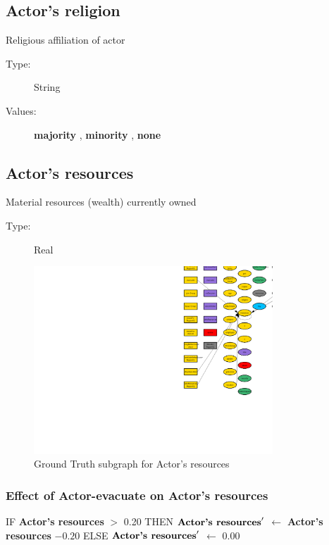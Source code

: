 \documentclass{article}%
\begin{document}
%
\subsection{Actor's religion}%
\label{subsec:Actor's religion}%
Religious affiliation of actor%
\begin{description}%
\item[Type:]%
String%
\item[Values:]%
\textbf{majority}%
, %
\textbf{minority}%
, %
\textbf{none}%
\end{description}

%
\subsection{Actor's resources}%
\label{subsec:Actor's resources}%
Material resources (wealth) currently owned%
\begin{description}%
\item[Type:]%
Real%
\end{description}%


\begin{figure}[ht]%
\centering%
\includegraphics[width=0.8\textwidth]{images/resourcesOfActor.png}%
\caption{Ground Truth subgraph for Actor's resources}%
\end{figure}

%
\subsubsection{Effect of Actor{-}evacuate on Actor's resources}%
\label{ssubsec:Effect of Actor{-}evacuate on Actor's resources}%
\begin{flushleft}%
IF %
\textbf{Actor's resources}%
$>$%
0.20%
\linebreak%
\hspace*{2em}%
THEN %
$\mbox{\textbf{Actor's resources}} '$%
$\leftarrow$%
\textbf{Actor's resources}%
${-}0.20$%
\linebreak%
\hspace*{2em}%
ELSE %
$\mbox{\textbf{Actor's resources}} '$%
$\leftarrow$%
0.00%
\end{flushleft}
\end{document}
